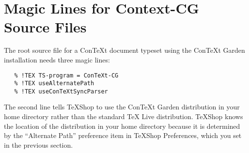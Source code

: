 \documentclass[11pt, oneside]{amsart}   	%
\begin{document}
\section{Magic Lines for Context-CG Source Files}

The root source file for a ConTeXt document typeset using the ConTeXt Garden installation needs three magic lines:
\begin{verbatim}
   % !TEX TS-program = ConTeXt-CG
   % !TEX useAlternatePath
   % !TEX useConTeXtSyncParser
\end{verbatim}
The  second line tells TeXShop to use the ConTeXt Garden distribution in your home directory rather than the standard TeX Live distribution. TeXShop knows the location of the distribution in your home directory because it is determined by the ``Alternate Path'' preference item in TeXShop Preferences, which you set in the previous section.
\end{document}
